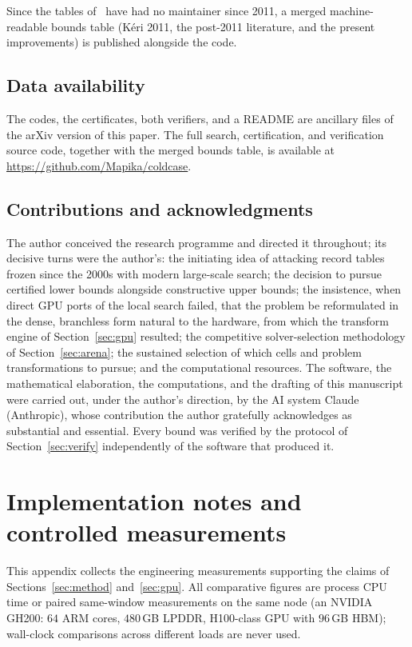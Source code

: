 \documentclass[11pt]{amsart}
\begin{document}
Since the tables of~\cite{Keri} have had no maintainer since 2011, a
merged machine-readable bounds table (K\'eri 2011, the post-2011
literature, and the present improvements) is published alongside the code.

\subsection*{Data availability}
The codes, the certificates, both verifiers, and a README are ancillary
files of the arXiv version of this paper. The full search, certification,
and verification source code, together with the merged bounds table, is
available at \url{https://github.com/Mapika/coldcase}.

\subsection*{Contributions and acknowledgments}
The author conceived the research programme and directed it throughout;
its decisive turns were the author's: the initiating idea of attacking record
tables frozen since the 2000s with modern large-scale search; the decision
to pursue certified lower bounds alongside constructive upper bounds; the
insistence, when direct GPU ports of the local search failed, that the
problem be reformulated in the dense, branchless form natural to the
hardware, from which the transform engine of Section~\ref{sec:gpu}
resulted; the competitive solver-selection methodology of
Section~\ref{sec:arena}; the sustained selection of which cells and
problem transformations to pursue; and the computational resources. The
software, the mathematical elaboration, the computations, and the drafting
of this manuscript were carried out, under the author's direction, by the
AI system Claude (Anthropic), whose contribution the author gratefully
acknowledges as substantial and essential. Every bound was verified by the
protocol of Section~\ref{sec:verify} independently of the software that
produced it.




\appendix

\section{Implementation notes and controlled measurements}\label{app:impl}

This appendix collects the engineering measurements supporting the claims
of Sections~\ref{sec:method} and~\ref{sec:gpu}. All comparative figures
are process CPU time or paired same-window measurements on the same node
(an NVIDIA GH200: $64$ ARM cores, $480$\,GB LPDDR, H100-class GPU with
$96$\,GB HBM); wall-clock comparisons across different loads are never
used.
\end{document}
